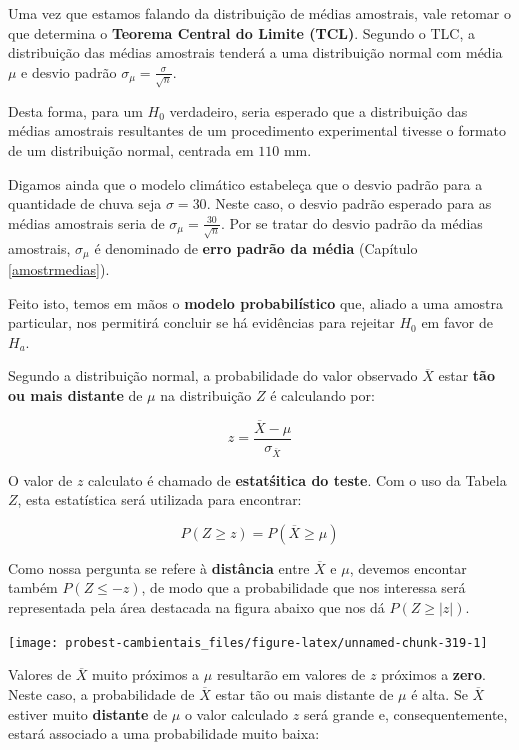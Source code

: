 \documentclass[
]{book}
\begin{document}
Uma vez que estamos falando da distribuição de médias amostrais, vale retomar o que determina o \textbf{Teorema Central do Limite (TCL)}. Segundo o TLC, a distribuição das médias amostrais tenderá a uma distribuição normal com média \(\mu\) e desvio padrão \(\sigma_{\mu} = \frac{\sigma}{\sqrt{n}}\).

Desta forma, para um \(H_0\) verdadeiro, seria esperado que a distribuição das médias amostrais resultantes de um procedimento experimental tivesse o formato de um distribuição normal, centrada em \(110\) mm.

Digamos ainda que o modelo climático estabeleça que o desvio padrão para a quantidade de chuva seja \(\sigma = 30\). Neste caso, o desvio padrão esperado para as médias amostrais seria de \(\sigma_{\mu} = \frac{30}{\sqrt{n}}\). Por se tratar do desvio padrão da médias amostrais, \(\sigma_{\mu}\) é denominado de \textbf{erro padrão da média} (Capítulo \ref{amostrmedias}).

Feito isto, temos em mãos o \textbf{modelo probabilístico} que, aliado a uma amostra particular, nos permitirá concluir se há evidências para rejeitar \(H_0\) em favor de \(H_a\).

Segundo a distribuição normal, a probabilidade do valor observado \(\overline{X}\) estar \textbf{tão ou mais distante} de \(\mu\) na distribuição \(Z\) é calculando por:

\[z = \frac{\overline{X} - \mu}{\sigma_{\overline{X}}}\]

O valor de \(z\) calculato é chamado de \textbf{estatśitica do teste}. Com o uso da Tabela \(Z\), esta estatística será utilizada para encontrar:

\[P(Z \ge z) = P(\overline{X} \ge \mu)\]

Como nossa pergunta se refere à \textbf{distância} entre \(\overline{X}\) e \(\mu\), devemos encontar também \(P(Z \le -z)\), de modo que a probabilidade que nos interessa será representada pela área destacada na figura abaixo que nos dá \(P(Z \ge |z|)\).

\begin{center}\texttt{[image: probest-cambientais\_files/figure-latex/unnamed-chunk-319-1]} \end{center}

Valores de \(\overline{X}\) muito próximos a \(\mu\) resultarão em valores de \(z\) próximos a \textbf{zero}. Neste caso, a probabilidade de \(\overline{X}\) estar tão ou mais distante de \(\mu\) é alta. Se \(\overline{X}\) estiver muito \textbf{distante} de \(\mu\) o valor calculado \(z\) será grande e, consequentemente, estará associado a uma probabilidade muito baixa:
\end{document}
